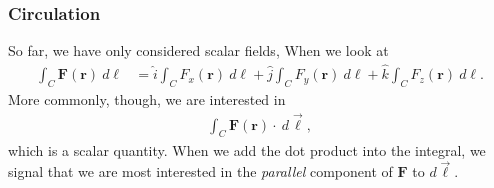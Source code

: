 \documentclass[10pt]{mypackage}
\begin{document}
\subsubsection{Circulation}%
So far, we have only considered scalar  fields, When we look at
\begin{align*}
  \int_{C}^{} \mathbf{F}\left(\mathbf{r}\right)\:d\ell &= \widehat{i}\int_{C}^{} F_x\left(\mathbf{r}\right)\:d\ell + \widehat{j}\int_{C}^{} F_y\left(\mathbf{r}\right)\:d\ell + \widehat{k}\int_{C}^{} F_z\left(\mathbf{r}\right)\:d\ell.
\end{align*}
More commonly, though, we are interested in
\begin{align*}
  \int_{C}^{} \mathbf{F}\left(\mathbf{r}\right)\cdot\:d\vec{\ell},
\end{align*}
which is a scalar quantity. When we add the dot product into the integral, we signal that we are most interested in the \textit{parallel} component of $\mathbf{F}$ to $d\vec{\ell}$.\newline
\end{document}
